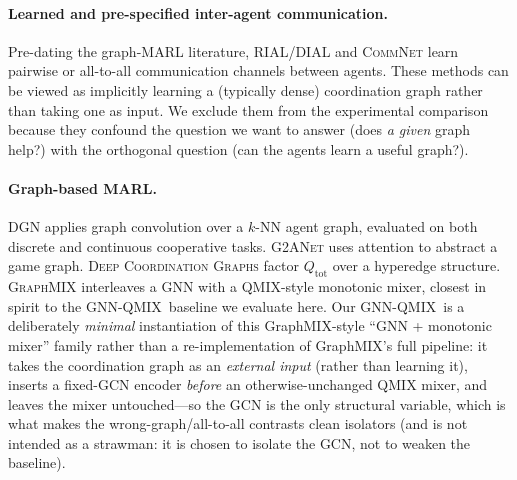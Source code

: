 \documentclass[manuscript, screen, review]{jair}
\providecommand{\citep}{\parencite}
\newcommand{\algoname}[1]{\textsc{#1}}
\newcommand{\gnnqmix}{\algoname{GNN-QMIX}}
\newcommand{\Qtot}{Q_{\mathrm{tot}}}
\begin{document}
\paragraph{Learned and pre-specified inter-agent communication.}
Pre-dating the graph-MARL literature, \algoname{RIAL/DIAL}
\citep{foerster_2016_rial_dial} and \algoname{CommNet}
\citep{sukhbaatar_2016_commnet} learn pairwise or all-to-all
communication channels between agents. These methods can be viewed as
implicitly learning a (typically dense) coordination graph rather than
taking one as input. We exclude them from the experimental comparison
because they confound the question we want to answer (does \emph{a given}
graph help?) with the orthogonal question (can the agents learn a useful
graph?).

\paragraph{Graph-based MARL.} \algoname{DGN} \citep{jiang_2020_dgn} applies
graph convolution over a $k$-NN agent graph, evaluated on both discrete
and continuous cooperative tasks.
\algoname{G2ANet} \citep{liu_2020_g2anet} uses attention to abstract a
game graph. \algoname{Deep Coordination Graphs}
\citep{boehmer_2020_dcg} factor $\Qtot$ over a hyperedge structure.
\algoname{GraphMIX} \citep{naderializadeh_2020_graphmix} interleaves a GNN
with a QMIX-style monotonic mixer, closest in spirit to the
\gnnqmix\ baseline we evaluate here. Our \gnnqmix\ is a deliberately
\emph{minimal} instantiation of this GraphMIX-style ``GNN + monotonic mixer''
family rather than a re-implementation of GraphMIX's full pipeline: it
takes the coordination graph as an \emph{external input} (rather than learning
it), inserts a fixed-GCN encoder \emph{before} an otherwise-unchanged QMIX
mixer, and leaves the mixer untouched---so the GCN is the only structural
variable, which is what makes the wrong-graph/all-to-all contrasts clean
isolators (and is not intended as a strawman: it is chosen to isolate the GCN,
not to weaken the baseline).
\end{document}
